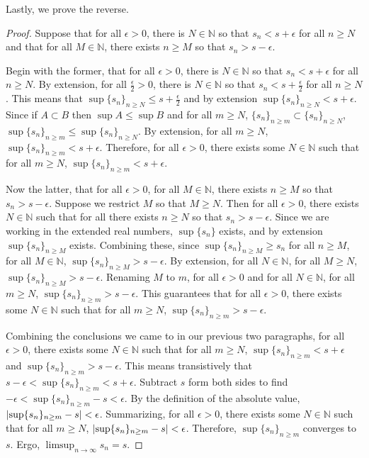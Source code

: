 \documentclass[11pt]{article}
\begin{document}
        Lastly, we prove the reverse.
        \begin{proof}
            Suppose that for all $\epsilon > 0$, there is $N \in \mathbb{N}$ so that $s_n < s + \epsilon$ for all $n \geq N$ and that for all $M \in \mathbb{N}$, there exists $n \geq M$ so that $s_n > s - \epsilon$.

            Begin with the former, that for all $\epsilon > 0$, there is $N \in \mathbb{N}$ so that $s_n < s + \epsilon$ for all $n \geq N$.
            By extension, for all $\frac{\epsilon}{2} > 0$, there is $N \in \mathbb{N}$ so that $s_n < s + \frac{\epsilon}{2}$ for all $n \geq N$.
            This means that $\sup\{s_n\}_{n \geq N} \leq s + \frac{\epsilon}{2}$ and by extension $\sup\{s_n\}_{n \geq N} < s + \epsilon$.
            Since if $A \subset B$ then $\sup A \leq \sup B$ and for all $m \geq N$, $\{s_n\}_{n \geq m} \subset \{s_n\}_{n \geq N}$, $\sup\{s_n\}_{n \geq m} \leq \sup\{s_n\}_{n \geq N}$.
            By extension, for all $m \geq N$, $\sup\{s_n\}_{n \geq m} < s + \epsilon$.
            Therefore, for all $\epsilon > 0$, there exists some $N \in \mathbb{N}$ such that for all $m \geq N$, $\sup\{s_n\}_{n \geq m} < s + \epsilon$.

            Now the latter, that for all $\epsilon > 0$, for all $M \in \mathbb{N}$, there exists $n \geq M$ so that $s_n > s - \epsilon$.
            Suppose we restrict $M$ so that $M \geq N$. 
            Then for all $\epsilon > 0$, there exists $N \in \mathbb{N}$ such that for all there exists $n \geq N$ so that $s_n > s - \epsilon$.
            Since we are working in the extended real numbers, $\sup \{s_n\}$ exists, and by extension $\sup \{s_n\}_{n \geq M}$ exists.
            Combining these, since $\sup \{s_n\}_{n \geq M} \geq s_n$ for all $n \geq M$, for all $M \in \mathbb{N}$, $\sup \{s_n\}_{n \geq M} > s - \epsilon$.
            By extension, for all $N \in \mathbb{N}$, for all $M \geq N$, $\sup \{s_n\}_{n \geq M} > s - \epsilon$.
            Renaming $M$ to $m$, for all $\epsilon > 0$ and for all $N \in \mathbb{N}$, for all $m \geq N$, $\sup \{s_n\}_{n \geq m} > s - \epsilon$.
            This guarantees that for all $\epsilon > 0$, there exists some $N \in \mathbb{N}$ such that for all $m \geq N$, $\sup \{s_n\}_{n \geq m} > s - \epsilon$.

            Combining the conclusions we came to in our previous two paragraphs, for all $\epsilon > 0$, there exists some $N \in \mathbb{N}$ such that for all $m \geq N$, $\sup\{s_n\}_{n \geq m} < s + \epsilon$ and $\sup \{s_n\}_{n \geq m} > s - \epsilon$.
            This means transistively that $s - \epsilon < \sup\{s_n\}_{n \geq m} < s + \epsilon$.
            Subtract $s$ form both sides to find $- \epsilon < \sup\{s_n\}_{n \geq m} - s < \epsilon$.
            By the definition of the absolute value, $\left| \sup\{s_n\}_{n \geq m} - s \right| < \epsilon$.
            Summarizing, for all $\epsilon > 0$, there exists some $N \in \mathbb{N}$ such that for all $m \geq N$, $\left| \sup\{s_n\}_{n \geq m} - s \right| < \epsilon$.
            Therefore, $\sup\{s_n\}_{n \geq m}$ converges to $s$.
            Ergo, $\limsup_{n \to \infty} s_n = s$.
        \end{proof}
\end{document}
